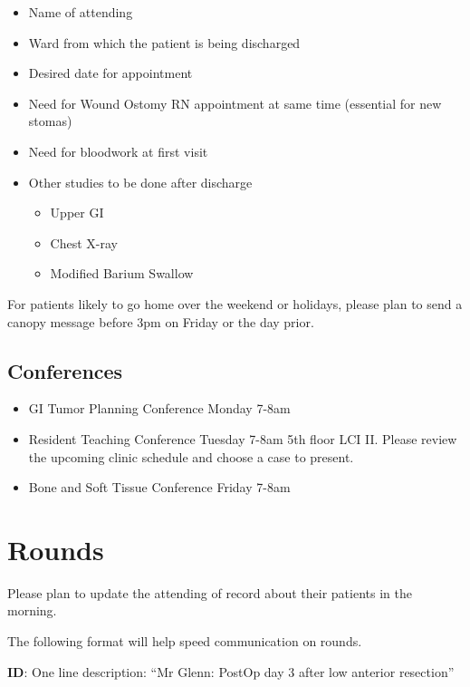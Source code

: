\documentclass[
]{book}
\providecommand{\tightlist}{%
  \setlength{\itemsep}{0pt}\setlength{\parskip}{0pt}}
\begin{document}
\begin{itemize}
\tightlist
\item
  Name of attending
\item
  Ward from which the patient is being discharged
\item
  Desired date for appointment
\item
  Need for Wound Ostomy RN appointment at same time (essential for new stomas)
\item
  Need for bloodwork at first visit
\item
  Other studies to be done after discharge

  \begin{itemize}
  \tightlist
  \item
    Upper GI
  \item
    Chest X-ray
  \item
    Modified Barium Swallow
  \end{itemize}
\end{itemize}

For patients likely to go home over the weekend or holidays, please plan to send a canopy message before 3pm on Friday or the day prior.

\hypertarget{conferences-1}{%
\section{Conferences}\label{conferences-1}}

\begin{itemize}
\tightlist
\item
  GI Tumor Planning Conference Monday 7-8am
\item
  Resident Teaching Conference Tuesday 7-8am 5th floor LCI II. Please review the upcoming clinic schedule and choose a case to present.
\item
  Bone and Soft Tissue Conference Friday 7-8am
\end{itemize}

\hypertarget{rounds-2}{%
\chapter{Rounds}\label{rounds-2}}

Please plan to update the attending of record about their patients in the morning.

The following format will help speed communication on rounds.

\textbf{ID}: One line description: ``Mr Glenn: PostOp day 3 after low anterior resection''
\end{document}
